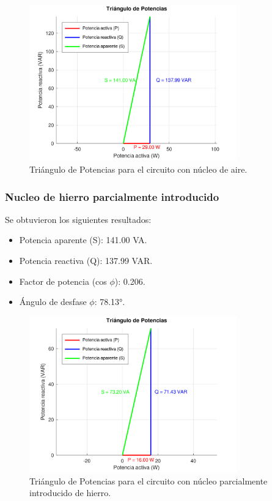 \documentclass{article}
\begin{document}
            \begin{figure}[H]
                \centering
                \includegraphics[width=0.8\textwidth]{graficoAire.png}
                \caption{Triángulo de Potencias para el circuito con núcleo de aire.}
                \label{fig:graficoAire}
            \end{figure}
        
        \subsubsection{Nucleo de hierro parcialmente introducido}
            
            Se obtuvieron los siguientes resultados:
            \begin{itemize}
                \item Potencia aparente (S): 141.00 VA.
                \item Potencia reactiva (Q): 137.99 VAR.
                \item Factor de potencia (cos $\phi$): 0.206.
                \item Ángulo de desfase $\phi$: 78.13°.
            \end{itemize}

            \begin{figure}[H]
                \centering
                \includegraphics[width=0.8\textwidth]{graficoParcialHierro.png}
                \caption{Triángulo de Potencias para el circuito con núcleo parcialmente introducido de hierro.}
                \label{fig:graficoParcialHierro}
            \end{figure}
\end{document}
